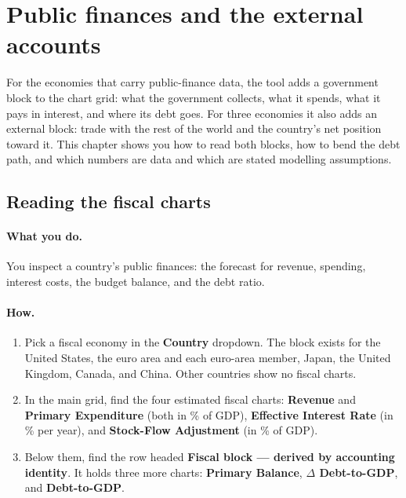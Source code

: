 \documentclass[11pt]{article}
\theoremstyle{definition}
\theoremstyle{remark}
\begin{document}
\section{Public finances and the external accounts}\label{sec:use-fiscal}

For the economies that carry public-finance data, the tool adds a government block to the
chart grid: what the government collects, what it spends, what it pays in interest, and where
its debt goes. For three economies it also adds an external block: trade with the rest of the
world and the country's net position toward it. This chapter shows you how to read both blocks,
how to bend the debt path, and which numbers are data and which are stated modelling assumptions.

\subsection{Reading the fiscal charts}

\paragraph{What you do.} You inspect a country's public finances: the forecast for revenue,
spending, interest costs, the budget balance, and the debt ratio.

\paragraph{How.}
\begin{enumerate}
  \item Pick a fiscal economy in the \textbf{Country} dropdown. The block exists for the
    United States, the euro area and each euro-area member, Japan, the United Kingdom, Canada,
    and China. Other countries show no fiscal charts.
  \item In the main grid, find the four estimated fiscal charts: \textbf{Revenue} and
    \textbf{Primary Expenditure} (both in \% of GDP), \textbf{Effective Interest Rate}
    (in \% per year), and \textbf{Stock-Flow Adjustment} (in \% of GDP).
  \item Below them, find the row headed \textbf{Fiscal block --- derived by accounting
    identity}. It holds three more charts: \textbf{Primary Balance}, \textbf{$\Delta$
    Debt-to-GDP}, and \textbf{Debt-to-GDP}.
\end{enumerate}
\end{document}
